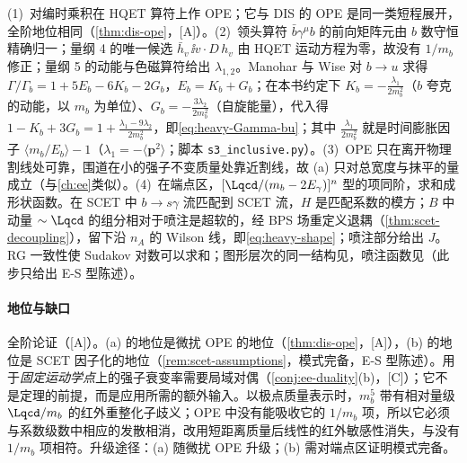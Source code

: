 \begin{proofsketch}
(1)~对编时乘积在 HQET 算符上作 OPE；它与 DIS 的 OPE 是同一类短程展开，全阶地位相同（\cref{thm:dis-ope}，[A]）。(2)~领头算符 $\bar b\gamma^\mu b$ 的前向矩阵元由 $b$ 数守恒精确归一；量纲 4 的唯一候选 $\bar h_v\,\ii v\cdot D\,h_v$ 由 HQET 运动方程为零，故没有 $1/m_b$ 修正\cite{ChayGeorgiGrinstein1990,BigiUraltsevVainshtein1992}；量纲 5 的动能与色磁算符给出 $\lambda_{1,2}$。Manohar 与 Wise 对 $b\to u$ 求得 $\Gamma/\Gamma_b=1+5E_b-6K_b-2G_b$，$E_b=K_b+G_b$\cite[式~(5.11)]{ManoharWise1994}；在本书约定下 $K_b=-\frac{\lambda_1}{2m_b^2}$（$b$ 夸克的动能，以 $m_b$ 为单位）、$G_b=-\frac{3\lambda_2}{2m_b^2}$（自旋能量），代入得 $1-K_b+3G_b=1+\frac{\lambda_1-9\lambda_2}{2m_b^2}$，即\cref{eq:heavy-Gamma-bu}；其中 $\frac{\lambda_1}{2m_b^2}$ 就是时间膨胀因子 $\langle m_b/E_b\rangle-1$（$\lambda_1=-\langle\bm p^2\rangle$；脚本 \texttt{s3\_\allowbreak inclusive.py}）。(3)~OPE 只在离开物理割线处可靠，围道在小的强子不变质量处靠近割线，故 (a) 只对总宽度与抹平的量成立（与\cref{ch:ee}类似）。(4)~在端点区，$[\Lqcd/(m_b-2E_\gamma)]^n$ 型的项同阶，求和成形状函数\cite{Neubert1994a,Neubert1994b,BigiEtAl1994}。在 SCET 中 $b\to s\gamma$ 流匹配到 SCET 流，$H$ 是匹配系数的模方；$B$ 中动量 $\sim\Lqcd$ 的组分相对于喷注是超软的，经 BPS 场重定义退耦（\cref{thm:scet-decoupling}），留下沿 $n_A$ 的 Wilson 线，即\cref{eq:heavy-shape}；喷注部分给出 $J$。RG 一致性使 Sudakov 对数可以求和\cite{BauerFlemingLuke2000}；图形层次的同一结构见\cite{KorchemskySterman1994}，喷注函数见\cite{Bauer:2003pi,Becher:2006qw}（此步只给出 E-S 型陈述）。
\end{proofsketch}

\paragraph{地位与缺口}
全阶论证（[A]）。(a) 的地位是微扰 OPE 的地位（\cref{thm:dis-ope}，[A]），(b) 的地位是 SCET 因子化的地位（\cref{rem:scet-assumptions}，模式完备，E-S 型陈述）。用于\emph{固定运动学点}上的强子衰变率需要局域对偶（\cref{conj:ee-duality}(b)，[C]）；它不是定理的前提，而是应用所需的额外输入。以极点质量表示时，$m_b^5$ 带有相对量级 $\Lqcd/m_b$ 的红外重整化子歧义\cite{Bigi:1994em,Beneke:1994sw}；OPE 中没有能吸收它的 $1/m_b$ 项，所以它必须与系数级数中相应的发散相消，改用短距离质量后线性的红外敏感性消失，与没有 $1/m_b$ 项相符\cite{Beneke:1994bc}。升级途径：(a) 随微扰 OPE 升级；(b) 需对端点区证明模式完备。

